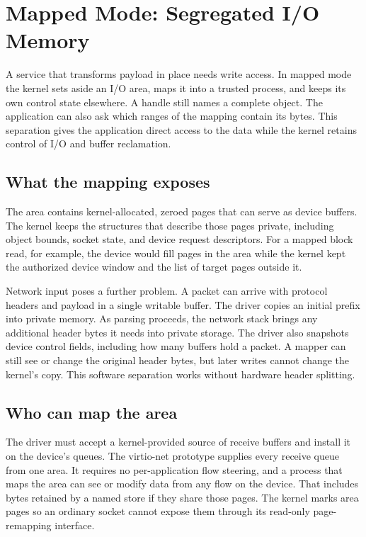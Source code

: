 \section{Mapped Mode: Segregated I/O Memory}
\label{sec:mapped}

A service that transforms payload in place needs write access. In mapped
mode the kernel sets aside an I/O area, maps it into a trusted process, and
keeps its own control state elsewhere. A handle still names a complete
object. The application can also ask which ranges of the mapping contain
its bytes. This separation gives the application direct access to the data
while the kernel retains control of I/O and buffer reclamation.

\subsection{What the mapping exposes}
\label{sec:mapped:segregation}

The area contains kernel-allocated, zeroed pages that can serve as device
buffers. The kernel keeps the structures that describe those pages private,
including object bounds, socket state, and device request descriptors. For
a mapped block read, for example, the device would fill pages in the area
while the kernel kept the authorized device window and the list of target
pages outside it.

Network input poses a further problem. A packet can arrive with protocol
headers and payload in a single writable buffer. The driver copies an initial
prefix into private memory. As parsing proceeds, the network stack brings any
additional header bytes it needs into private storage. The driver also snapshots
device control fields, including how many buffers hold a packet. A mapper can
still see or change the original header bytes, but later writes cannot change
the kernel's copy. This software separation works without hardware header
splitting.

\subsection{Who can map the area}
\label{sec:mapped:trust}

The driver must accept a kernel-provided source of receive buffers and install
it on the device's queues. The virtio-net prototype supplies every receive
queue from one area. It requires no per-application flow steering, and a
process that maps the area can see or modify data from any flow on the
device. That includes bytes retained by a named store if they share those
pages. The kernel marks area pages so an ordinary socket cannot expose them
through its read-only page-remapping interface.

